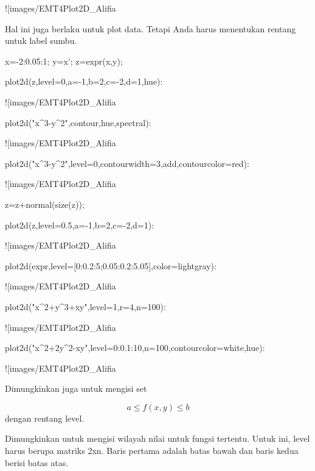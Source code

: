 \documentclass{article}
\begin{document}
![images/EMT4Plot2D_Alifia%

Hal ini juga berlaku untuk plot data. Tetapi Anda harus menentukan
rentang untuk label sumbu.


\>x=-2:0.05:1; y=x'; z=expr(x,y);

\>plot2d(z,level=0,a=-1,b=2,c=-2,d=1,\>hue):


![images/EMT4Plot2D_Alifia%

\>plot2d("x^3-y^2",\>contour,\>hue,\>spectral):


![images/EMT4Plot2D_Alifia%

\>plot2d("x^3-y^2",level=0,contourwidth=3,\>add,contourcolor=red):


![images/EMT4Plot2D_Alifia%

\>z=z+normal(size(z));

\>plot2d(z,level=0.5,a=-1,b=2,c=-2,d=1):


![images/EMT4Plot2D_Alifia%

\>plot2d(expr,level=[0:0.2:5;0.05:0.2:5.05],color=lightgray):


![images/EMT4Plot2D_Alifia%

\>plot2d("x^2+y^3+x\*y",level=1,r=4,n=100):


![images/EMT4Plot2D_Alifia%

\>plot2d("x^2+2\*y^2-x\*y",level=0:0.1:10,n=100,contourcolor=white,\>hue):


![images/EMT4Plot2D_Alifia%

Dimungkinkan juga untuk mengisi set


$$a \le f(x,y) \le b$$dengan rentang level.


Dimungkinkan untuk mengisi wilayah nilai untuk fungsi tertentu. Untuk
ini, level harus berupa matriks 2xn. Baris pertama adalah batas bawah
dan baris kedua berisi batas atas.
\end{document}
